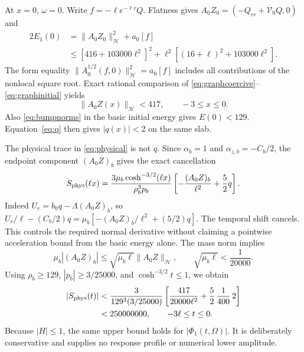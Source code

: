 \documentclass[11pt]{article}
\newcommand{\norm}[1]{\lVert #1\rVert}
\newcommand{\HH}{\mathcal H}
\begin{document}
At $x=0$, $\omega=0$. Write $f=-\ell e^{-\ell r}Q$.
Flatness gives $A_0Z_0=(-Q_{rr}+\mathcal V_0Q,0)$ and
\begin{equation}
\begin{aligned}
 2E_1(0)&=\norm{A_0Z_0}_{\HH}^2+a_0[f]\\
 &\le[416+103000\ell^2]^2
       +\ell^2[(16+\ell)^2+103000\ell^2].
\end{aligned}
\label{eq:graphinitial}
\end{equation}
The form equality
$\norm{A_0^{1/2}(f,0)}_{\HH}^2=a_0[f]$ includes all contributions of
the nonlocal square root. Exact rational comparison of
\eqref{eq:graphcoercive}--\eqref{eq:graphinitial} yields
\begin{equation}
 \norm{A_0Z(x)}_{\HH}<417,\qquad-3\le x\le0.
 \label{eq:417}
\end{equation}
Also \eqref{eq:bumpnorms} in the basic initial energy gives $E(0)<129$.
Equation~\eqref{eq:q} then gives $|q(x)|<2$ on the same slab.

The physical trace in \eqref{eq:physical} is not $q$.
Since $\alpha_b=1$ and $\alpha_{z,b}=-C_b/2$, the endpoint component
$(A_0Z)_b$ gives the exact cancellation
\begin{equation}
\begin{aligned}
 S_{\rm phys}(\ell x)
 =\frac{3\mu_b\cosh^{-3/2}(\ell x)}{\rho_b^3p_b}
       \left[-\frac{(A_0Z)_b}{\ell^2}+\frac52q\right].
\end{aligned}
\label{eq:traceidentity}
\end{equation}
Indeed $U_r=b_0q-\Lambda(A_0Z)_b$, so
$U_r/\ell-(C_b/2)q=\mu_b[-(A_0Z)_b/\ell^2+(5/2)q]$.
The temporal shift cancels. This controls the required normal derivative
without claiming a pointwise acceleration bound from the basic energy alone.
The mass norm implies
\begin{equation}
 \mu_b|(A_0Z)_b|\le\sqrt{\mu_b\ell}\norm{A_0Z}_{\HH},
 \qquad \sqrt{\mu_b\ell}<\frac1{20000}.
 \label{eq:boundarygraph}
\end{equation}
Using $\rho_b\ge129$, $|p_b|\ge3/25000$, and
$\cosh^{-3/2}t\le1$, we obtain
\begin{equation}
\begin{aligned}
 |S_{\rm phys}(t)|
 &<\frac{3}{129^3(3/25000)}
   \left[\frac{417}{20000\ell^2}
                    +\frac52\,\frac1{400}\,2\right]\\
 &<250000000,\qquad -3\ell\le t\le0 .
\end{aligned}
\label{eq:physicalbound}
\end{equation}
Because $|H|\le1$, the same upper bound holds for $|\Phi_1(t,\Omega)|$.
It is deliberately conservative and supplies no response profile or
numerical lower amplitude.
\end{document}
